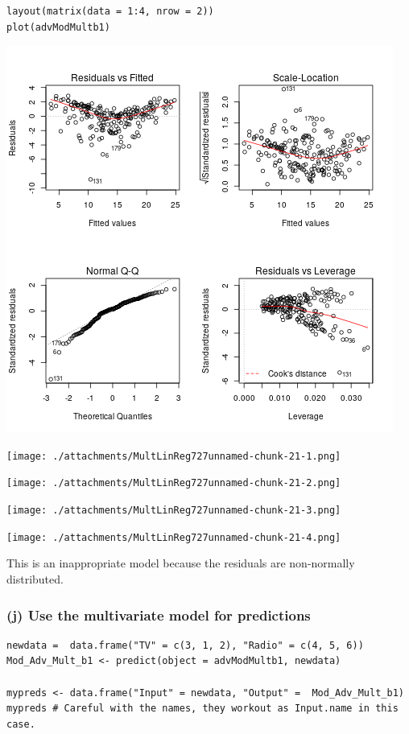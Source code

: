 \documentclass[11pt]{article}
\begin{document}
\begin{verbatim}
layout(matrix(data = 1:4, nrow = 2))
plot(advModMultb1)
\end{verbatim}

\begin{center}
\includegraphics[width=.9\linewidth]{ResidualLinePlotMultLinReg.png}
\end{center}

\begin{center}
\texttt{[image: ./attachments/MultLinReg727unnamed-chunk-21-1.png]}
\end{center}\begin{center}
\texttt{[image: ./attachments/MultLinReg727unnamed-chunk-21-2.png]}
\end{center}\begin{center}
\texttt{[image: ./attachments/MultLinReg727unnamed-chunk-21-3.png]}
\end{center}\begin{center}
\texttt{[image: ./attachments/MultLinReg727unnamed-chunk-21-4.png]}
\end{center}

This is an inappropriate model because the residuals are non-normally
distributed.

\subsubsection{(j) Use the multivariate model for predictions}
\label{sec:org1afd5bd}
\begin{verbatim}
newdata =  data.frame("TV" = c(3, 1, 2), "Radio" = c(4, 5, 6))
Mod_Adv_Mult_b1 <- predict(object = advModMultb1, newdata)

mypreds <- data.frame("Input" = newdata, "Output" =  Mod_Adv_Mult_b1)
mypreds # Careful with the names, they workout as Input.name in this case.
\end{verbatim}
\end{document}
